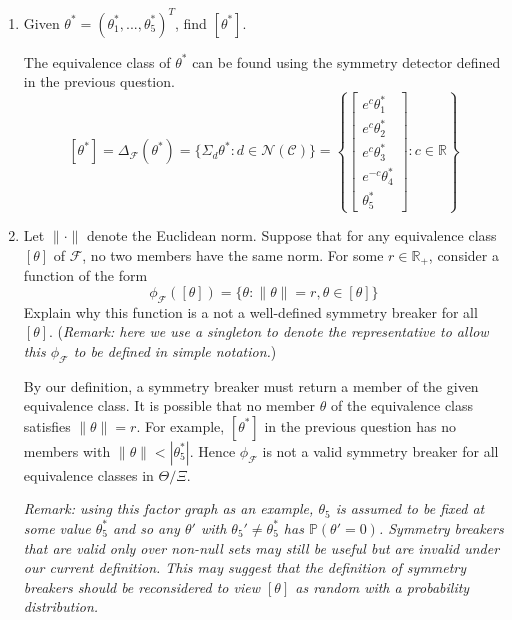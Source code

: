 \begin{enumerate}
\begin{enumerate}
\item
Given $\theta^*=(\theta_1^*,...,\theta_5^*)^T$, find $[\theta^*]$.

\begin{solution}
The equivalence class of $\theta^*$ can be found using the symmetry detector defined in the previous question.
\[
[\theta^*] = \Delta_\mathcal{F}(\theta^*) = \{\Sigma_d\theta^*:d\in\mathcal{N}(\mathcal{C})\} = \left\{
\begin{bmatrix}
e^c\theta_1^* \\
e^c\theta_2^* \\
e^c\theta_3^* \\
e^{-c}\theta_4^* \\
\theta_5^*
\end{bmatrix}
:
c\in\mathbb{R}
\right\}
\]
\end{solution}

\item
Let $\|\cdot\|$ denote the Euclidean norm. Suppose that for any equivalence class $[\theta]$ of $\mathcal{F}$, no two members have the same norm. For some $r\in\mathbb{R}_+$, consider a function of the form
\[
\phi_\mathcal{F}([\theta])=\{\theta:\|\theta\|=r,\theta\in[\theta]\}
\]
Explain why this function is a not a well-defined symmetry breaker for all $[\theta]$. (\textit{Remark: here we use a singleton to denote the representative to allow this $\phi_\mathcal{F}$ to be defined in simple notation.})

\begin{solution}
By our definition, a symmetry breaker must return a member of the given equivalence class. It is possible that no member $\theta$ of the equivalence class satisfies $\|\theta\|=r$. For example, $[\theta^*]$ in the previous question has no members with $\|\theta\|<|\theta^*_5|$. Hence $\phi_\mathcal{F}$ is not a valid symmetry breaker for all equivalence classes in $\Theta/\Xi$.

\textit{Remark: using this factor graph as an example, $\theta_5$ is assumed to be fixed at some value $\theta_5^*$ and so any $\theta'$ with $\theta_5'\neq\theta_5^*$ has $\mathbb{P}(\theta'=0)$. Symmetry breakers that are valid only over non-null sets may still be useful but are invalid under our current definition. This may suggest that the definition of symmetry breakers should be reconsidered to view $[\theta]$ as random with a probability distribution.}
\end{solution}

\end{enumerate}


\end{enumerate}
